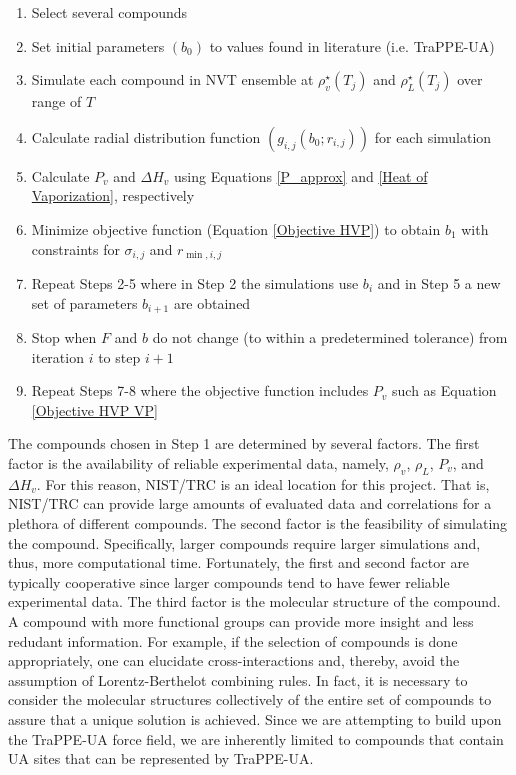 \documentclass[12pt]{article}
\begin{document}
\begin{enumerate}
\item Select several compounds
\item Set initial parameters $(b_0)$ to values found in literature (i.e. TraPPE-UA)
\item Simulate each compound in NVT ensemble at $\rho_v^{\star}(T_j)$ and $\rho_L^{\star}(T_j)$ over range of $T$
\item Calculate radial distribution function $(g_{i,j}(b_0;r_{i,j}))$ for each simulation
\item Calculate $P_v$ and $\Delta H_v$ using Equations \ref{P_approx} and \ref{Heat of Vaporization}, respectively
\item Minimize objective function (Equation \ref{Objective HVP}) to obtain $b_1$ with constraints for $\sigma_{i,j}$ and $r_{\min,i,j}$
\item Repeat Steps 2-5 where in Step 2 the simulations use $b_i$ and in Step 5 a new set of parameters $b_{i+1}$ are obtained
\item Stop when $F$ and $b$ do not change (to within a predetermined tolerance) from iteration $i$ to step $i+1$
\item Repeat Steps 7-8 where the objective function includes $P_v$ such as Equation \ref{Objective HVP VP}
\end{enumerate}

The compounds chosen in Step 1 are determined by several factors. The first factor is the availability of reliable experimental data, namely, $\rho_v$, $\rho_L$, $P_v$, and $\Delta H_v$. For this reason, NIST/TRC is an ideal location for this project. That is, NIST/TRC can provide large amounts of evaluated data and correlations for a plethora of different compounds. The second factor is the feasibility of simulating the compound. Specifically, larger compounds require larger simulations and, thus, more computational time. Fortunately, the first and second factor are typically cooperative since larger compounds tend to have fewer reliable experimental data. The third factor is the molecular structure of the compound. A compound with more functional groups can provide more insight and less redudant information. For example, if the selection of compounds is done appropriately, one can elucidate cross-interactions and, thereby, avoid the assumption of Lorentz-Berthelot combining rules. In fact, it is necessary to consider the molecular structures collectively of the entire set of compounds to assure that a unique solution is achieved. Since we are attempting to build upon the TraPPE-UA force field, we are inherently limited to compounds that contain UA sites that can be represented by TraPPE-UA.
\end{document}
